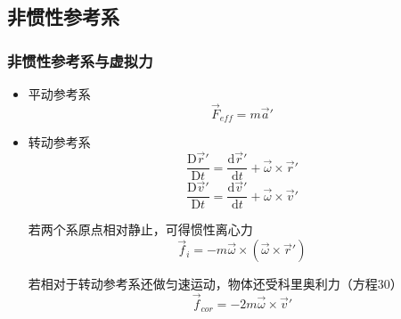 \documentclass[UTF8]{ctexart}
\begin{document}
	\subsection{非惯性参考系}
		\subsubsection{非惯性参考系与虚拟力}
			\begin{itemize}
				\item 平动参考系
					\begin{equation}
						\vec{F}_{eff} = m\vec{a}'
					\end{equation} 
				\item 转动参考系
					\begin{equation}
						\frac{\mathrm{D}\vec{r}'}{\mathrm{D}t} = \frac{\mathrm{d}\vec{r}'}{\mathrm{d}t} + \vec{\omega}\times \vec{r}'
					\end{equation} 
					\begin{equation}
						\frac{\mathrm{D}\vec{v}'}{\mathrm{D}t} = \frac{\mathrm{d}\vec{v}'}{\mathrm{d}t} + \vec{\omega}\times \vec{v}'
					\end{equation}
					\par 若两个系原点相对静止，可得惯性离心力
					\begin{equation}
						\vec{f}_i = -m\vec{\omega}\times(\vec{\omega}\times \vec{r}')
					\end{equation}
					\par 若相对于转动参考系还做匀速运动，物体还受科里奥利力（方程30）
					\begin{equation}
						\vec{f}_{cor} = -2m\vec{\omega}\times\vec{v}'
					\end{equation}
			\end{itemize}

			
\end{document}
